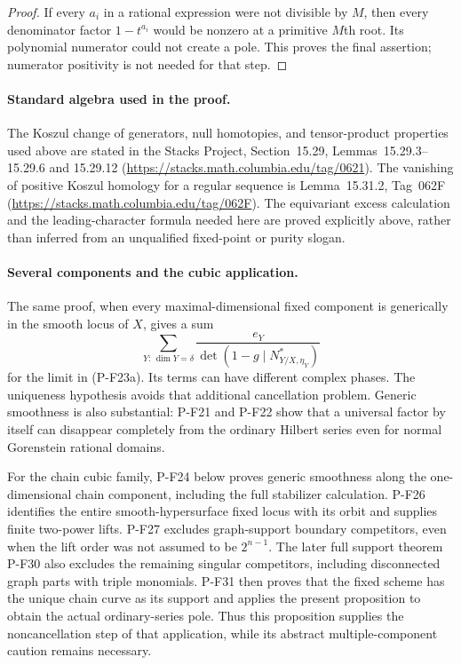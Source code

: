 \begin{proof}
If every $a_i$ in a rational expression were not divisible
by $M$, then every denominator factor $1-t^{a_i}$ would
be nonzero at a primitive $M$th root. Its polynomial numerator
could not create a pole. This proves the final assertion;
numerator positivity is not needed for that step.
\end{proof}

\paragraph{Standard algebra used in the proof.}
The Koszul change of generators, null homotopies, and tensor-product
properties used above are stated in the Stacks Project,
Section~15.29, Lemmas~15.29.3--15.29.6 and 15.29.12
(\url{https://stacks.math.columbia.edu/tag/0621}). The vanishing
of positive Koszul homology for a regular sequence is
Lemma~15.31.2, Tag~062F
(\url{https://stacks.math.columbia.edu/tag/062F}). The
equivariant excess calculation and the leading-character formula
needed here are proved explicitly above, rather than inferred
from an unqualified fixed-point or purity slogan.

\paragraph{Several components and the cubic application.}
The same proof, when every maximal-dimensional fixed component
is generically in the smooth locus of $X$, gives a sum
\[
 \sum_{Y:\,\dim Y=\delta}
       \frac{e_Y}{\det(1-g\mid N^*_{Y/X,\eta_Y})}
 \tag{P-F23g}
\]
for the limit in (P-F23a). Its terms can have different complex
phases. The uniqueness hypothesis avoids that additional
cancellation problem. Generic smoothness is also substantial:
P-F21 and P-F22 show that a universal factor by itself can
disappear completely from the ordinary Hilbert series even
for normal Gorenstein rational domains.

For the chain cubic family, P-F24 below proves generic smoothness
along the one-dimensional chain component, including the full
stabilizer calculation. P-F26 identifies the entire smooth-hypersurface
fixed locus with its orbit and supplies finite two-power lifts.
P-F27 excludes graph-support boundary competitors, even when the
lift order was not assumed to be $2^{n-1}$. The later full support
theorem P-F30 also excludes the remaining singular competitors,
including disconnected graph parts with triple monomials. P-F31
then proves that the fixed scheme has the unique chain curve as
its support and applies the present proposition to obtain the
actual ordinary-series pole. Thus this proposition supplies the
noncancellation step of that application, while its abstract
multiple-component caution remains necessary.
